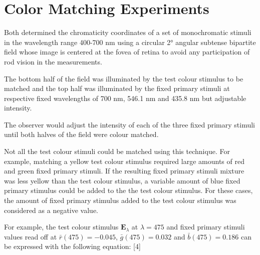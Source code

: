 \section{Color Matching Experiments}%
\label{sec:color-matching-experiments}


Both determined the chromaticity coordinates of a set of monochromatic stimuli in the wavelength range 400-700 nm using a circular 2° angular subtense bipartite field whose image is centered at the fovea of retina to avoid any participation of rod vision in the measurements.

The bottom half of the field was illuminated by the test colour stimulus to be matched and the top half was illuminated by the fixed primary stimuli at respective fixed wavelengths of 700 nm, 546.1 nm and 435.8 nm but adjustable intensity.

The observer would adjust the intensity of each of the three fixed primary stimuli until both halves of the field were colour matched.

Not all the test colour stimuli could be matched using this technique. For example, matching a yellow test colour stimulus required large amounts of red and green fixed primary stimuli. If the resulting fixed primary stimuli mixture was less yellow than the test colour stimulus, a variable amount of blue fixed primary stimulus could be added to the the test colour stimulus. For these cases, the amount of fixed primary stimulus added to the test colour stimulus was considered as a negative value.

For example, the test colour stimulus $\textbf{E}_\lambda$ at $\lambda=475$ and fixed primary stimuli values read off at $\bar{r}(475)=-0.045$, $\bar{g}(475)=0.032$ and $\bar{b}(475)=0.186$ can be expressed with the following equation: [4]


